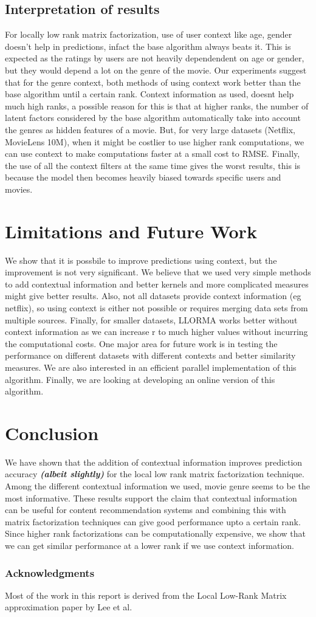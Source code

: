 \documentclass[10 pt,table]{article}  %
\begin{document}
\subsection{Interpretation of results}
For locally low rank matrix factorization, use of user context like age, gender doesn't help in predictions, infact the base algorithm always beats it. This is expected as the ratings by users are not  heavily dependendent on age or gender, but they would depend a lot on the genre of the movie. Our experiments suggest that for the genre context, both methods of using context work better than the base algorithm until a certain rank. Context information as used, doesnt help much high ranks, a possible reason for this is that at higher ranks, the number of latent factors considered by the base algorithm automatically take into account the genres as hidden features of a movie. But, for very large datasets (Netflix, MovieLens 10M), when it might be costlier to use higher rank computations, we can use context to make computations faster at a small cost to RMSE. Finally, the use of all the context filters at the same time gives the worst results, this is because the model then becomes heavily biased towards specific users and movies.

\section{Limitations and Future Work}
We show that it is possbile to improve predictions using context, but the improvement is not very significant. We believe that we used very simple methods to add contextual information and better kernels and more complicated measures might give better results. Also, not all datasets provide context information (eg netflix), so using context is either not possible or requires merging data sets from multiple sources. Finally, for smaller datasets, LLORMA works better without context information as we can increase r to much higher values without incurring the computational costs. One major area for future work is in testing the performance on different datasets with different contexts and better similarity measures. We are also interested in an efficient parallel implementation of this algorithm. Finally, we are looking at developing an online version of this algorithm.

\section{Conclusion}
We have shown that the addition of contextual information improves prediction accuracy \textbf{\emph{(albeit slightly)}} for the local low rank matrix factorization technique. Among the different contextual information we used, movie genre seems to be the most informative. These results support the claim that contextual information can be useful for content recommendation systems and combining this with matrix factorization techniques can give good performance upto a certain rank. Since higher rank factorizations can be computationally expensive, we show that we can get similar performance at a lower rank if we use context information.

\subsubsection*{Acknowledgments}
Most of the work in this report is derived from the Local Low-Rank Matrix approximation paper \cite{lee2013local} by Lee et al.



\end{document}
